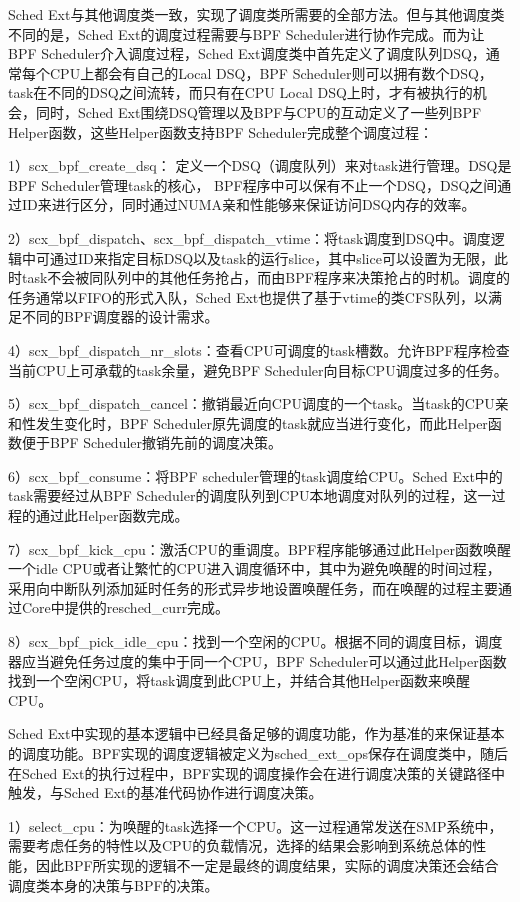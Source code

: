 Sched Ext与其他调度类一致，实现了调度类所需要的全部方法。但与其他调度类不同的是，Sched Ext的调度过程需要与BPF Scheduler进行协作完成。而为让BPF Scheduler介入调度过程，Sched Ext调度类中首先定义了调度队列DSQ，通常每个CPU上都会有自己的Local DSQ，BPF Scheduler则可以拥有数个DSQ，task在不同的DSQ之间流转，而只有在CPU Local DSQ上时，才有被执行的机会，同时，Sched Ext围绕DSQ管理以及BPF与CPU的互动定义了一些列BPF Helper函数，这些Helper函数支持BPF Scheduler完成整个调度过程：

1）scx_bpf_create_dsq： 定义一个DSQ（调度队列）来对task进行管理。DSQ是BPF Scheduler管理task的核心， BPF程序中可以保有不止一个DSQ，DSQ之间通过ID来进行区分，同时通过NUMA亲和性能够来保证访问DSQ内存的效率。

2）scx_bpf_dispatch、scx_bpf_dispatch_vtime：将task调度到DSQ中。调度逻辑中可通过ID来指定目标DSQ以及task的运行slice，其中slice可以设置为无限，此时task不会被同队列中的其他任务抢占，而由BPF程序来决策抢占的时机。调度的任务通常以FIFO的形式入队，Sched Ext也提供了基于vtime的类CFS队列，以满足不同的BPF调度器的设计需求。

4）scx_bpf_dispatch_nr_slots：查看CPU可调度的task槽数。允许BPF程序检查当前CPU上可承载的task余量，避免BPF Scheduler向目标CPU调度过多的任务。

5）scx_bpf_dispatch_cancel：撤销最近向CPU调度的一个task。当task的CPU亲和性发生变化时，BPF Scheduler原先调度的task就应当进行变化，而此Helper函数便于BPF Scheduler撤销先前的调度决策。

6）scx_bpf_consume：将BPF scheduler管理的task调度给CPU。Sched Ext中的task需要经过从BPF Scheduler的调度队列到CPU本地调度对队列的过程，这一过程的通过此Helper函数完成。

7）scx_bpf_kick_cpu：激活CPU的重调度。BPF程序能够通过此Helper函数唤醒一个idle CPU或者让繁忙的CPU进入调度循环中，其中为避免唤醒的时间过程，采用向中断队列添加延时任务的形式异步地设置唤醒任务，而在唤醒的过程主要通过Core中提供的resched_curr完成。

8）scx_bpf_pick_idle_cpu：找到一个空闲的CPU。根据不同的调度目标，调度器应当避免任务过度的集中于同一个CPU，BPF Scheduler可以通过此Helper函数找到一个空闲CPU，将task调度到此CPU上，并结合其他Helper函数来唤醒CPU。

Sched Ext中实现的基本逻辑中已经具备足够的调度功能，作为基准的来保证基本的调度功能。BPF实现的调度逻辑被定义为sched_ext_ops保存在调度类中，随后在Sched Ext的执行过程中，BPF实现的调度操作会在进行调度决策的关键路径中触发，与Sched Ext的基准代码协作进行调度决策。

1）select_cpu：为唤醒的task选择一个CPU。这一过程通常发送在SMP系统中，需要考虑任务的特性以及CPU的负载情况，选择的结果会影响到系统总体的性能，因此BPF所实现的逻辑不一定是最终的调度结果，实际的调度决策还会结合调度类本身的决策与BPF的决策。

